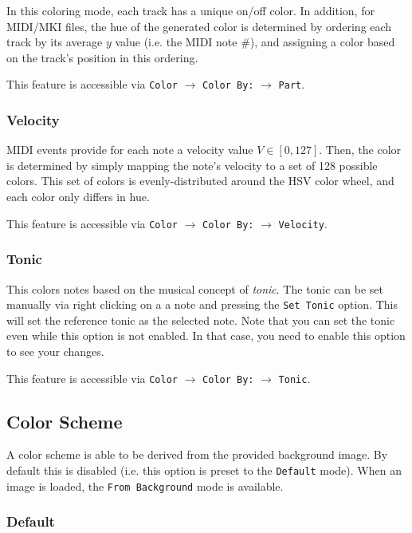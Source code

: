 \documentclass[english]{article}
\providecommand{\mi}[1]{\texttt{#1}}
\begin{document}
In this coloring mode, each track has a unique on/off color. In addition, for MIDI/MKI files, the hue of the generated
color is determined by ordering each track by its average $y$ value (i.e. the MIDI note \#), and assigning
a color based on the track's position in this ordering.

This feature is accessible via 
\mi{Color} $\rightarrow$ \mi{Color By:} $\rightarrow$ \mi{Part}.

\subsubsection{Velocity}

MIDI events provide for each note a velocity value $V \in [0, 127]$. Then, the color is determined by simply mapping 
the note's velocity to a set of 128 possible colors. This set of colors is evenly-distributed around
the HSV color wheel, and each color only differs in hue.

This feature is accessible via 
\mi{Color} $\rightarrow$ \mi{Color By:} $\rightarrow$ \mi{Velocity}.

\subsubsection{Tonic}

This colors notes based on the musical concept of \textit{tonic}. The tonic can be set manually via right clicking on a
a note and pressing the \mi{Set Tonic} option. This will set the reference tonic as the selected note. Note that you 
can set the tonic even while this option is not enabled. In that case, you need to enable this option to see your changes.

This feature is accessible via 
\mi{Color} $\rightarrow$ \mi{Color By:} $\rightarrow$ \mi{Tonic}.

\subsection{Color Scheme}

A color scheme is able to be derived from the provided background image. By default this is disabled (i.e.
this option is preset to the \mi{Default} mode). When an image is loaded, the \mi{From Background} mode is available.

\subsubsection{Default}
\end{document}
